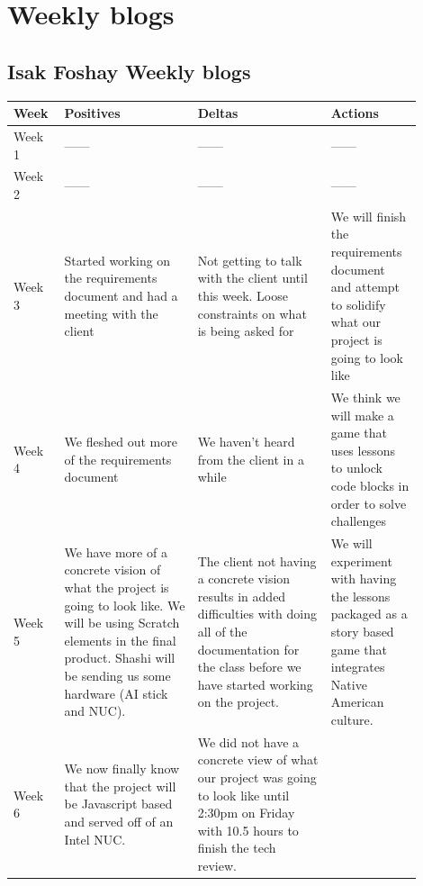 \documentclass[draftclsnofoot,10pt,onecolumn]{IEEEtran}
\begin{document}
\section{Weekly blogs}
\subsection{Isak Foshay Weekly blogs}
\begin{tabular}{p{0.1\linewidth}p{0.3\linewidth}p{0.3\linewidth}p{0.2\linewidth}}
        \hline
            \textbf{Week}
             & \textbf{Positives}
             & \textbf{Deltas}
             & \textbf{Actions}\\
             \hline
             Week 1
             & ------
             & ------
             & ------\\
             \hline
             Week 2
             & ------
             & ------
             & ------\\
             \hline
             Week 3
             & Started working on the requirements document and had a meeting with the client
             & Not getting to talk with the client until this week. Loose constraints on what is being asked for
             & We will finish the requirements document and attempt to solidify what our project is going to look like\\
            \hline
             Week 4
             & We fleshed out more of the requirements document
             & We haven't heard from the client in a while
             & We think we will make a game that uses lessons to unlock code blocks in order to solve challenges\\
            \hline
             Week 5
             & We have more of a concrete vision of what the project is going to look like. We will be using Scratch elements in the final product. Shashi will be sending us some hardware (AI stick and NUC).
             & The client not having a concrete vision results in added difficulties with doing all of the documentation for the class before we have started working on the project.
             & We will experiment with having the lessons packaged as a story based game that integrates Native American culture.\\
            \hline
             Week 6
             & We now finally know that the project will be Javascript based and served off of an Intel NUC.
             & We did not have a concrete view of what our project was going to look like until 2:30pm on Friday with 10.5 hours to finish the tech review.

\end{tabular}
\end{document}
